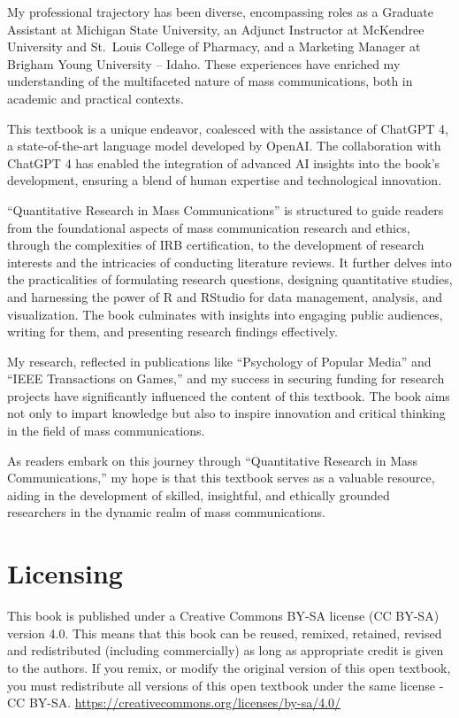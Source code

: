 \documentclass[
]{book}
\begin{document}
My professional trajectory has been diverse, encompassing roles as a Graduate Assistant at Michigan State University, an Adjunct Instructor at McKendree University and St.~Louis College of Pharmacy, and a Marketing Manager at Brigham Young University -- Idaho. These experiences have enriched my understanding of the multifaceted nature of mass communications, both in academic and practical contexts.

This textbook is a unique endeavor, coalesced with the assistance of ChatGPT 4, a state-of-the-art language model developed by OpenAI. The collaboration with ChatGPT 4 has enabled the integration of advanced AI insights into the book's development, ensuring a blend of human expertise and technological innovation.

``Quantitative Research in Mass Communications'' is structured to guide readers from the foundational aspects of mass communication research and ethics, through the complexities of IRB certification, to the development of research interests and the intricacies of conducting literature reviews. It further delves into the practicalities of formulating research questions, designing quantitative studies, and harnessing the power of R and RStudio for data management, analysis, and visualization. The book culminates with insights into engaging public audiences, writing for them, and presenting research findings effectively.

My research, reflected in publications like ``Psychology of Popular Media'' and ``IEEE Transactions on Games,'' and my success in securing funding for research projects have significantly influenced the content of this textbook. The book aims not only to impart knowledge but also to inspire innovation and critical thinking in the field of mass communications.

As readers embark on this journey through ``Quantitative Research in Mass Communications,'' my hope is that this textbook serves as a valuable resource, aiding in the development of skilled, insightful, and ethically grounded researchers in the dynamic realm of mass communications.

\hypertarget{licensing}{%
\section*{Licensing}\label{licensing}}

This book is published under a Creative Commons BY-SA license (CC BY-SA) version 4.0. This means that this book can be reused, remixed, retained, revised and redistributed (including commercially) as long as appropriate credit is given to the authors. If you remix, or modify the original version of this open textbook, you must redistribute all versions of this open textbook under the same license - CC BY-SA. \url{https://creativecommons.org/licenses/by-sa/4.0/}
\end{document}
